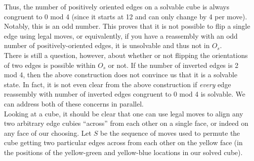 \documentclass[10pt,letterpaper]{report}
\begin{document}
Thus, the number of positively oriented edges on a solvable cube is always congruent to 0 mod 4 (since it starts at 12 and can only change by 4 per move).  Notably, this is an odd number.  This proves that it is not possible to flip a single edge using legal moves, or equivalently, if you have a reassembly with an odd number of positively-oriented edges, it is unsolvable and thus not in $O_s$. \\

There is still a question, however, about whether or not flipping the orientations of two edges is possible within $O_s$ or not.  If the number of inverted edges is 2 mod 4, then the above construction does not convince us that it is a solvable state.  In fact, it is not even clear from the above construction if \textit{every} edge reassembly with number of inverted edges congruent to 0 mod 4 is solvable.  We can address both of these concerns in parallel. \\

Looking at a cube, it should be clear that one can use legal moves to align any two arbitrary edge cubies ``across'' from each other on a single face, or indeed on any face of our choosing.  Let $S$ be the sequence of moves used to permute the cube getting two particular edges across from each other on the yellow face (in the positions of the yellow-green and yellow-blue locations in our solved cube).
\end{document}
